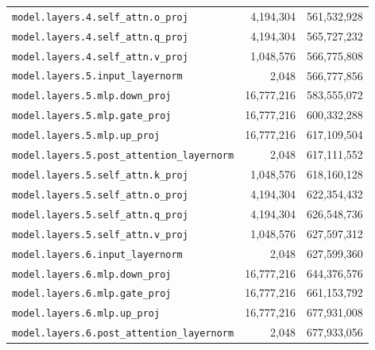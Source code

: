 \documentclass[10pt,a4paper]{article}
\theoremstyle{definition}
\begin{document}
\begin{appendices}
\begin{longtable}{p{9.5cm}rr}
\texttt{model.\allowbreak{}layers.\allowbreak{}4.\allowbreak{}self\_attn.\allowbreak{}o\_proj} & 4,194,304 & 561,532,928 \\
\texttt{model.\allowbreak{}layers.\allowbreak{}4.\allowbreak{}self\_attn.\allowbreak{}q\_proj} & 4,194,304 & 565,727,232 \\
\texttt{model.\allowbreak{}layers.\allowbreak{}4.\allowbreak{}self\_attn.\allowbreak{}v\_proj} & 1,048,576 & 566,775,808 \\
\texttt{model.\allowbreak{}layers.\allowbreak{}5.\allowbreak{}input\_layernorm} & 2,048 & 566,777,856 \\
\texttt{model.\allowbreak{}layers.\allowbreak{}5.\allowbreak{}mlp.\allowbreak{}down\_proj} & 16,777,216 & 583,555,072 \\
\texttt{model.\allowbreak{}layers.\allowbreak{}5.\allowbreak{}mlp.\allowbreak{}gate\_proj} & 16,777,216 & 600,332,288 \\
\texttt{model.\allowbreak{}layers.\allowbreak{}5.\allowbreak{}mlp.\allowbreak{}up\_proj} & 16,777,216 & 617,109,504 \\
\texttt{model.\allowbreak{}layers.\allowbreak{}5.\allowbreak{}post\_attention\_layernorm} & 2,048 & 617,111,552 \\
\texttt{model.\allowbreak{}layers.\allowbreak{}5.\allowbreak{}self\_attn.\allowbreak{}k\_proj} & 1,048,576 & 618,160,128 \\
\texttt{model.\allowbreak{}layers.\allowbreak{}5.\allowbreak{}self\_attn.\allowbreak{}o\_proj} & 4,194,304 & 622,354,432 \\
\texttt{model.\allowbreak{}layers.\allowbreak{}5.\allowbreak{}self\_attn.\allowbreak{}q\_proj} & 4,194,304 & 626,548,736 \\
\texttt{model.\allowbreak{}layers.\allowbreak{}5.\allowbreak{}self\_attn.\allowbreak{}v\_proj} & 1,048,576 & 627,597,312 \\
\texttt{model.\allowbreak{}layers.\allowbreak{}6.\allowbreak{}input\_layernorm} & 2,048 & 627,599,360 \\
\texttt{model.\allowbreak{}layers.\allowbreak{}6.\allowbreak{}mlp.\allowbreak{}down\_proj} & 16,777,216 & 644,376,576 \\
\texttt{model.\allowbreak{}layers.\allowbreak{}6.\allowbreak{}mlp.\allowbreak{}gate\_proj} & 16,777,216 & 661,153,792 \\
\texttt{model.\allowbreak{}layers.\allowbreak{}6.\allowbreak{}mlp.\allowbreak{}up\_proj} & 16,777,216 & 677,931,008 \\
\texttt{model.\allowbreak{}layers.\allowbreak{}6.\allowbreak{}post\_attention\_layernorm} & 2,048 & 677,933,056 \\

\end{longtable}
\end{appendices}
\end{document}
